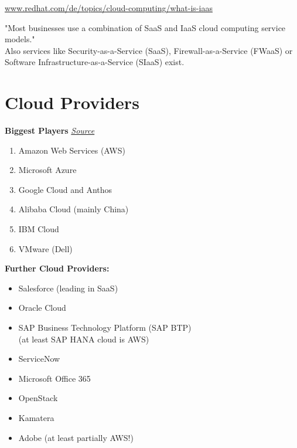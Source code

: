 \documentclass[12pt]{article}
\begin{document}
\begin{center}
    \url{www.redhat.com/de/topics/cloud-computing/what-is-iaas}
\end{center}
"Most businesses use a combination of SaaS and IaaS cloud computing service models." \\
Also services like Security-as-a-Service (SaaS), Firewall-as-a-Service (FWaaS) or Software Infrastructure-as-a-Service (SIaaS) exist.

\section*{Cloud Providers} 
\textbf{Biggest Players} \hspace{11cm} \href{https://www.zdnet.com/article/the-top-cloud-providers-of-2021-aws-microsoft-azure-google-cloud-hybrid-saas/}{\textit{Source}}
\begin{enumerate}
    \item Amazon Web Services (AWS)
    \item Microsoft Azure
    \item Google Cloud and Anthos
    \item Alibaba Cloud (mainly China)
    \item IBM Cloud
    \item VMware (Dell)
\end{enumerate}
\textbf{Further Cloud Providers:}
\begin{itemize}
    \item Salesforce (leading in SaaS)
    \item Oracle Cloud
    \item SAP Business Technology Platform (SAP BTP) \\
    (at least SAP HANA cloud is AWS)
    \item ServiceNow
    \item Microsoft Office 365
    \item OpenStack
    \item Kamatera
    \item Adobe (at least partially AWS!)
\end{itemize}


\newpage
\end{document}
